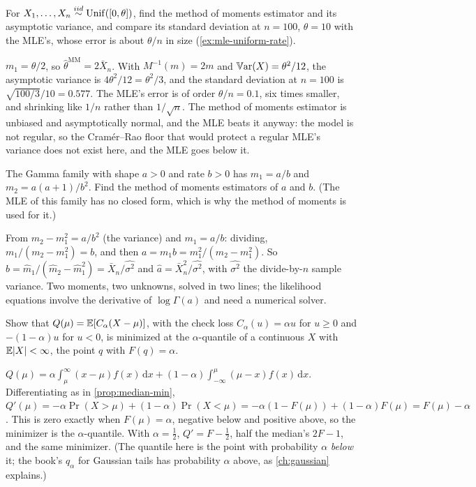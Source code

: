 \begin{exercise}
\label{ex:mom-uniform}
For $X_1, \ldots, X_n \stackrel{iid}{\sim} \mathrm{Unif}([0, \theta])$, find the method of moments estimator and its asymptotic variance, and compare its standard deviation at $n = 100$, $\theta = 10$ with the MLE's, whose error is about $\theta/n$ in size (\cref{ex:mle-uniform-rate}).
\end{exercise}
\begin{solution}
$m_1 = \theta/2$, so $\hat{\theta}^{\text{MM}} = 2\bar{X}_n$. With $M^{-1}(m) = 2m$ and $\operatorname*{\mathbb{V}\text{ar}}(X) = \theta^2/12$, the asymptotic variance is $4\theta^2/12 = \theta^2/3$, and the standard deviation at $n = 100$ is $\sqrt{100/3}/10 = 0.577$. The MLE's error is of order $\theta/n = 0.1$, six times smaller, and shrinking like $1/n$ rather than $1/\sqrt{n}$. The method of moments estimator is unbiased and asymptotically normal, and the MLE beats it anyway: the model is not regular, so the Cram\'er--Rao floor that would protect a regular MLE's variance does not exist here, and the MLE goes below it.
\end{solution}

\begin{exercise}
\label{ex:mom-gamma}
The Gamma family with shape $a > 0$ and rate $b > 0$ has $m_1 = a/b$ and $m_2 = a(a + 1)/b^2$. Find the method of moments estimators of $a$ and $b$. (The MLE of this family has no closed form, which is why the method of moments is used for it.)
\end{exercise}
\begin{solution}
From $m_2 - m_1^2 = a/b^2$ (the variance) and $m_1 = a/b$: dividing, $m_1/(m_2 - m_1^2) = b$, and then $a = m_1 b = m_1^2/(m_2 - m_1^2)$. So $\hat{b} = \hat{m}_1/(\hat{m}_2 - \hat{m}_1^2) = \bar{X}_n/\widehat{\sigma^2}$ and $\hat{a} = \bar{X}_n^2/\widehat{\sigma^2}$, with $\widehat{\sigma^2}$ the divide-by-$n$ sample variance. Two moments, two unknowns, solved in two lines; the likelihood equations involve the derivative of $\log\Gamma(a)$ and need a numerical solver.
\end{solution}

\begin{exercise}
\label{ex:mest-quantile}
Show that $Q(\mu) = \operatorname*{\mathbb{E}}[C_\alpha(X - \mu)]$, with the check loss $C_\alpha(u) = \alpha u$ for $u \geq 0$ and $-(1 - \alpha)u$ for $u < 0$, is minimized at the $\alpha$-quantile of a continuous $X$ with $\operatorname*{\mathbb{E}}\lvert X\rvert < \infty$, the point $q$ with $F(q) = \alpha$.
\end{exercise}
\begin{solution}
$Q(\mu) = \alpha\int_\mu^\infty (x - \mu)f(x)\,\mathrm{d}x + (1 - \alpha)\int_{-\infty}^\mu (\mu - x)f(x)\,\mathrm{d}x$. Differentiating as in \cref{prop:median-min}, $Q'(\mu) = -\alpha\Pr(X > \mu) + (1 - \alpha)\Pr(X < \mu) = -\alpha(1 - F(\mu)) + (1 - \alpha)F(\mu) = F(\mu) - \alpha$. This is zero exactly when $F(\mu) = \alpha$, negative below and positive above, so the minimizer is the $\alpha$-quantile. With $\alpha = \frac12$, $Q' = F - \frac12$, half the median's $2F - 1$, and the same minimizer. (The quantile here is the point with probability $\alpha$ \textit{below} it; the book's $q_\alpha$ for Gaussian tails has probability $\alpha$ above, as \cref{ch:gaussian} explains.)
\end{solution}

